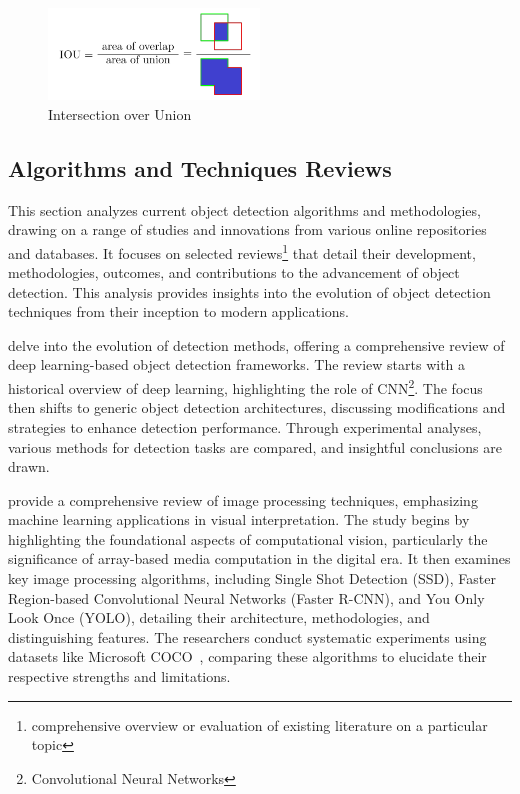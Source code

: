 \begin{figure}[h]
    \centering 
    \includegraphics[width=0.5\textwidth]{figs/iou.png} 
    \caption{Intersection over Union \cite{rfc25}}
    \label{fig:iou}
\end{figure}

\subsection{Algorithms and Techniques Reviews}
This section analyzes current object detection algorithms and methodologies, drawing on a range of studies and innovations from various online repositories and databases. It focuses on selected reviews\footnote{comprehensive overview or evaluation of existing literature on a particular topic} that detail their development, methodologies, outcomes, and contributions to the advancement of object detection. This analysis provides insights into the evolution of object detection techniques from their inception to modern applications.

\citet{rfc2} delve into the evolution of detection methods, offering a comprehensive review of deep learning-based object detection frameworks. The review starts with a historical overview of deep learning, highlighting the role of CNN\footnote{Convolutional Neural Networks}. The focus then shifts to generic object detection architectures, discussing modifications and strategies to enhance detection performance. Through experimental analyses, various methods for detection tasks are compared, and insightful conclusions are drawn.

\citet{rfc8} provide a comprehensive review of image processing techniques, emphasizing machine learning applications in visual interpretation. The study begins by highlighting the foundational aspects of computational vision, particularly the significance of array-based media computation in the digital era. It then examines key image processing algorithms, including Single Shot Detection (SSD), Faster Region-based Convolutional Neural Networks (Faster R-CNN), and You Only Look Once (YOLO), detailing their architecture, methodologies, and distinguishing features. The researchers conduct systematic experiments using datasets like Microsoft COCO~\cite{rfc16}, comparing these algorithms to elucidate their respective strengths and limitations.

